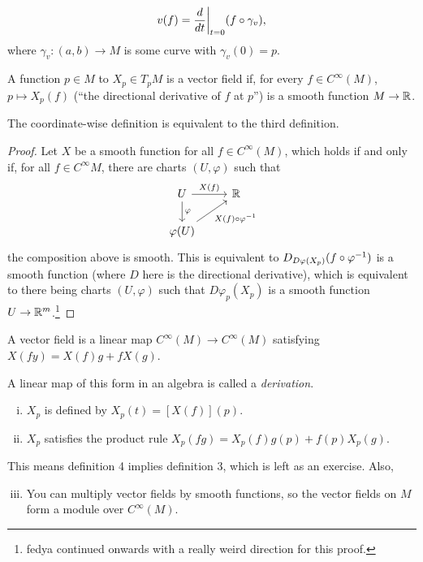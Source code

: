 \[ v(f) = \restr{\frac{d}{dt}}{t=0} (f \circ \gamma_v), \]
where $\gamma_v \colon (a, b) \to M$ is some curve with $\gamma_v(0) = p$.
\begin{definition}
    A function $p \in M$ to $X_p \in T_p M$ is a vector field if, for every $f \in C^\infty(M)$, $p \mapsto X_p(f)$ (``the directional derivative of $f$ at $p$'') is a smooth function $M \to \mathbb R$.
\end{definition}
\begin{proposition}
    The coordinate-wise definition is equivalent to the third definition.
\end{proposition}
\begin{proof}
    Let $X$ be a smooth function for all $f \in C^\infty(M)$, which holds if and only if, for all $f \in C^\infty M$, there are charts $(U, \varphi)$ such that
    \[ \begin{tikzcd} U \arrow[r, "X(f)"] \arrow[d, "\varphi"] & \RR \\ \varphi(U) \arrow[ur, "X(f) \circ \varphi\inv"'] \end{tikzcd} \]
    the composition above is smooth. This is equivalent to $D_{D \varphi(X_p)} (f \circ \varphi^{-1})$ is a smooth function (where $D$ here is the directional derivative), which is equivalent to there being charts $(U, \varphi)$ such that $D \varphi_p (X_p)$ is a smooth function $U \to \mathbb R^m$.\footnote{fedya continued onwards with a really weird direction for this proof.}
\end{proof}
\begin{definition}
    A vector field is a linear map $C^\infty(M) \to C^\infty(M)$ satisfying $X(fy) = X(f) g + f X(g)$.
\end{definition}
A linear map of this form in an algebra is called a \textit{derivation}.
\begin{enumerate}[(i)]
    \item $X_p$ is defined by $X_p(t) = [X(f)](p)$.
    \item $X_p$ satisfies the product rule $X_p(fg) = X_p(f) g(p) + f(p) X_p(g)$.
\end{enumerate}
This means definition 4 implies definition 3, which is left as an exercise. Also,
\begin{enumerate}[(i)] \setcounter{enumi}{2}
    \item You can multiply vector fields by smooth functions, so the vector fields on $M$ form a module over $C^\infty(M)$.
\end{enumerate}